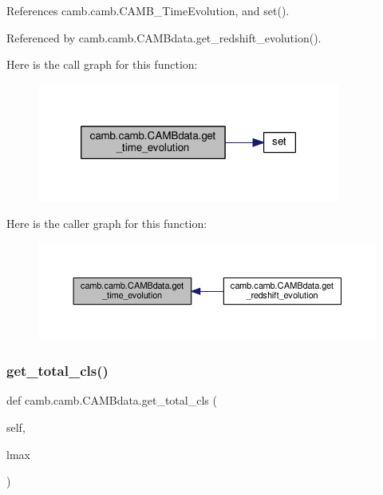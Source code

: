 References camb.\+camb.\+C\+A\+M\+B\+\_\+\+Time\+Evolution, and set().



Referenced by camb.\+camb.\+C\+A\+M\+Bdata.\+get\+\_\+redshift\+\_\+evolution().

Here is the call graph for this function\+:
\nopagebreak
\begin{figure}[H]
\begin{center}
\leavevmode
\includegraphics[width=282pt]{classcamb_1_1camb_1_1CAMBdata_ac826165c4abf9f9d2afd26a082345023_cgraph}
\end{center}
\end{figure}
Here is the caller graph for this function\+:
\nopagebreak
\begin{figure}[H]
\begin{center}
\leavevmode
\includegraphics[width=350pt]{classcamb_1_1camb_1_1CAMBdata_ac826165c4abf9f9d2afd26a082345023_icgraph}
\end{center}
\end{figure}
\mbox{\label{classcamb_1_1camb_1_1CAMBdata_aeb52734403fbeae2815b9fb8fa6227d5}} 
\subsubsection{\texorpdfstring{get\+\_\+total\+\_\+cls()}{get\_total\_cls()}}
{\footnotesize\ttfamily def camb.\+camb.\+C\+A\+M\+Bdata.\+get\+\_\+total\+\_\+cls (\begin{DoxyParamCaption}\item[{}]{self,  }\item[{}]{lmax }\end{DoxyParamCaption})}

